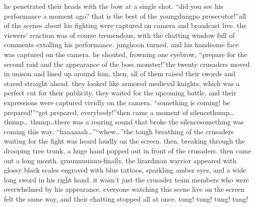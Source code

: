 he penetrated their heads with the bow at a single shot.
“did you see his performance a moment ago? that is the best of the youngdungpo prosecutor!”all of the scenes about his fighting were captured on camera and broadcast live.
the viewers’ reaction was of course tremendous, with the chatting window full of comments extolling his performance.
junghoon turned, and his handsome face was captured on the camera.
he shouted, frowning one eyebrow, “prepare for the second raid and the appearance of the boss monster!”the twenty crusaders moved in unison and lined up around him.
 then, all of them raised their swords and stared straight ahead.
they looked like armored medieval knights, which was a perfect cut for their publicity.
they waited for the upcoming battle, and their expressions were captured vividly on the camera.
“something is coming! be prepared!”“get prepared, everybody!”then came a moment of silencethump… thump… thump…there was a roaring sound that broke the silencesomething was coming this way.
“haaaaaah…”“whew…”the tough breathing of the crusaders waiting for the fight was heard loudly on the screen.
then, breaking through the drooping tree trunk, a huge hand popped out in front of the crusaders.
 then came out a long mouth.
gruuuuuuuuu-finally, the lizardman warrior appeared with glossy black scales engraved with blue tattoos, sparkling amber eyes, and a wide long sword in his right hand.
it wasn’t just the crusader team members who were overwhelmed by his appearance.
 everyone watching this scene live on the screen felt the same way, and their chatting stopped all at once.
tung! tung! tung! tung!

 